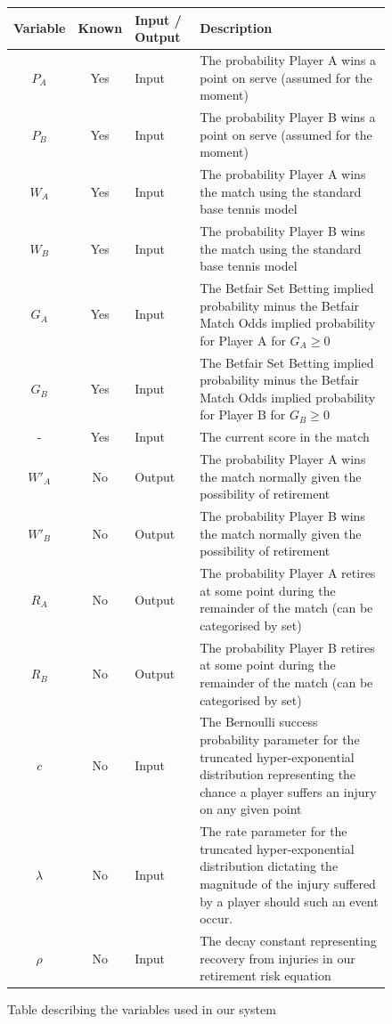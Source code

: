\documentclass[letterpaper,12pt]{article}
\begin{document}
\begin{figure}[H]
\begin{center}
\renewcommand{\arraystretch}{1.1}
\begin{tabular}{|c|c|C{1.5cm}|C{7.3cm}|}
	\hline
	\textbf{Variable} & \textbf{Known} & \textbf{Input / Output} & \textbf{Description} \\ \hline
	$P_A$ & Yes & Input & The probability Player A wins a point on serve (assumed for the moment) \\ \hline
	$P_B$ & Yes & Input & The probability Player B wins a point on serve (assumed for the moment) \\ \hline
	$W_A$ & Yes & Input & The probability Player A wins the match using the standard base tennis model \\ \hline
	$W_B$ & Yes & Input & The probability Player B wins the match using the standard base tennis model	 \\ \hline
	$G_A$ & Yes & Input & The Betfair Set Betting implied probability minus the Betfair Match Odds implied probability for Player A for $G_A \geq 0$ \\ \hline
	$G_B$ & Yes & Input & The Betfair Set Betting implied probability minus the Betfair Match Odds implied probability for Player B for $G_B \geq 0$	 \\ \hline
	- & Yes & Input & The current score in the match \\ \hline \hline
	$W'_A$ & No & Output & The probability Player A wins the match normally given the possibility of retirement \\ \hline
	$W'_B$ & No & Output & The probability Player B wins the match normally given the possibility of retirement \\ \hline
	$R_A$ & No & Output & The probability Player A retires at some point during the remainder of the match (can be categorised by set) \\ \hline
	$R_B$ & No & Output & The probability Player B retires at some point during the remainder of the match (can be categorised by set) \\ \hline \hline
	$c$ & No & Input & The Bernoulli success probability parameter for the truncated hyper-exponential distribution representing the chance a player suffers an injury on any given point	\\ \hline
	$\lambda$ & No & Input & The rate parameter for the truncated hyper-exponential distribution dictating the magnitude of the injury suffered by a player should such an event occur. \\ \hline
	$\rho$ & No & Input & The decay constant representing recovery from injuries in our retirement risk equation	 \\ \hline
\end{tabular}
\renewcommand{\arraystretch}{1}
\end{center}
\caption{Table describing the variables used in our system}
\label{variabletable}
\end{figure}
\end{document}
